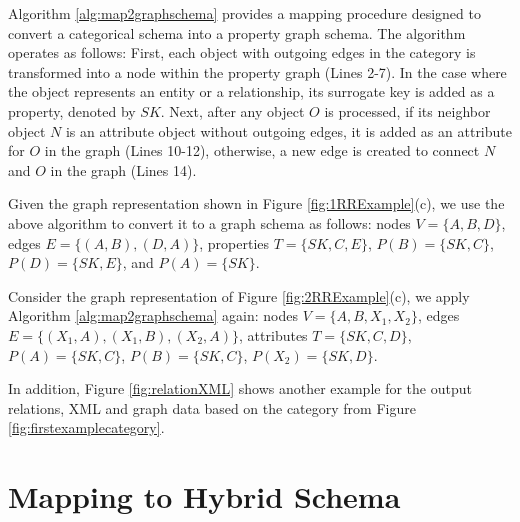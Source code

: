 Algorithm \ref{alg:map2graphschema} provides a mapping procedure designed to convert a categorical schema into a property graph schema.  The algorithm operates as follows: First, each object with outgoing edges in the category is transformed into a node within the property graph (Lines 2-7). In the case where the object represents an entity or a relationship, its surrogate key is added as a property, denoted by $SK$. Next, after any object $O$ is processed,  if its neighbor object $N$  is an attribute object without outgoing edges, it is added as an attribute for $O$ in the graph (Lines 10-12), otherwise, a new edge is created to connect $N$ and $O$ in the graph (Lines 14).






\begin{example}
Given the graph representation shown in Figure \ref{fig:1RRExample}(c), we use the above algorithm to convert it to a graph schema as follows: nodes $V= \{A,B,D\}$, edges $E= \{(A,B),(D,A)\}$, properties $T=\{SK, C, E\}$, $P(B)=\{SK, C\}$, $P(D)=\{SK, E\}$, and $P(A)=\{SK\}$.
\end{example}


\begin{example}
 Consider the graph representation of Figure \ref{fig:2RRExample}(c), we apply Algorithm \ref{alg:map2graphschema} again: nodes $V= \{A,B,X_1,X_2\}$, edges $E= \{(X_1,A),(X_1,B),(X_2,A)\}$, attributes $T=\{SK, C,D\}$, $P(A)=\{SK,C\}$,  $P(B)=\{SK,C\}$, $P(X_2)=\{SK,D\}$.
\end{example}

In addition, Figure \ref{fig:relationXML} shows another example for the output relations, XML and graph data based on the category from Figure \ref{fig:firstexamplecategory}.







\section{Mapping to Hybrid Schema}
\label{sec:hybrid}

